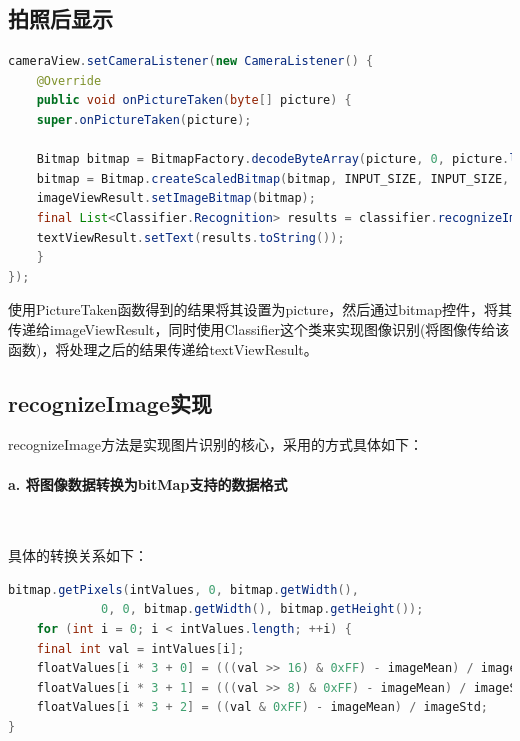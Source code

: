 \documentclass[UTF8, Microsoft YaHei]{book}
\begin{document}
	\subsection{拍照后显示}
\begin{small}
\begin{lstlisting}[language=java]
cameraView.setCameraListener(new CameraListener() {
    @Override
    public void onPictureTaken(byte[] picture) {
    super.onPictureTaken(picture);

    Bitmap bitmap = BitmapFactory.decodeByteArray(picture, 0, picture.length);
    bitmap = Bitmap.createScaledBitmap(bitmap, INPUT_SIZE, INPUT_SIZE, false);
    imageViewResult.setImageBitmap(bitmap);
    final List<Classifier.Recognition> results = classifier.recognizeImage(bitmap);
    textViewResult.setText(results.toString());
    }
});
\end{lstlisting}
\end{small}

	使用PictureTaken函数得到的结果将其设置为picture，然后通过bitmap控件，将其传递给imageViewResult，同时使用Classifier这个类来实现图像识别(将图像传给该函数)，将处理之后的结果传递给textViewResult。

	\subsection{recognizeImage实现}

	recognizeImage方法是实现图片识别的核心，采用的方式具体如下：

	\paragraph{a. 将图像数据转换为bitMap支持的数据格式}

	~

	具体的转换关系如下：

\begin{small}
\begin{lstlisting}[language=java]
bitmap.getPixels(intValues, 0, bitmap.getWidth(),
			 0, 0, bitmap.getWidth(), bitmap.getHeight());
    for (int i = 0; i < intValues.length; ++i) {
    final int val = intValues[i];
    floatValues[i * 3 + 0] = (((val >> 16) & 0xFF) - imageMean) / imageStd;
    floatValues[i * 3 + 1] = (((val >> 8) & 0xFF) - imageMean) / imageStd;
    floatValues[i * 3 + 2] = ((val & 0xFF) - imageMean) / imageStd;
}
\end{lstlisting}
\end{small}
\end{document}
